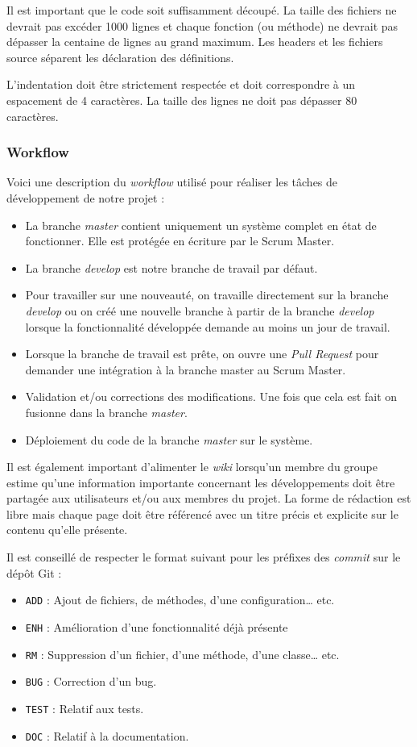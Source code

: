 \documentclass[10pt,a4paper]{article}
\begin{document}
Il est important que le code soit suffisamment découpé. La taille des fichiers ne devrait pas excéder 1000 lignes et chaque fonction (ou méthode) ne devrait pas dépasser la centaine de lignes au grand maximum. Les headers et les fichiers source séparent les déclaration des définitions.

L'indentation doit être strictement respectée et doit correspondre à un espacement de 4 caractères. La taille des lignes ne doit pas dépasser 80 caractères.


\subsubsection{Workflow}

Voici une description du \textit{workflow} utilisé pour réaliser les tâches de développement de notre projet :
\begin{itemize}
\item La branche \textit{master} contient uniquement un système complet en état de fonctionner. Elle est protégée en écriture par le Scrum Master.
\item La branche \textit{develop} est notre branche de travail par défaut.
\item Pour travailler sur une nouveauté, on travaille directement sur la branche \textit{develop} ou on créé une nouvelle branche à partir de la branche \textit{develop} lorsque la fonctionnalité développée demande au moins un jour de travail.
\item Lorsque la branche de travail est prête, on ouvre une \textit{Pull Request} pour demander une intégration à la branche master au Scrum Master.
\item Validation et/ou corrections des modifications. Une fois que cela est fait on fusionne dans la branche \textit{master}.
\item Déploiement du code de la branche \textit{master} sur le système.
\end{itemize}

Il est également important d'alimenter le \textit{wiki} lorsqu'un membre du groupe estime qu'une information importante concernant les développements doit être partagée aux utilisateurs et/ou aux membres du projet. La forme de rédaction est libre mais chaque page doit être référencé avec un titre précis et explicite sur le contenu qu'elle présente.

Il est conseillé de respecter le format suivant pour les préfixes des \textit{commit} sur le dépôt Git :
\begin{itemize}

\item \verb|ADD| : Ajout de fichiers, de méthodes, d'une configuration… etc.
\item \verb|ENH| : Amélioration d'une fonctionnalité déjà présente
\item \verb|RM| : Suppression d'un fichier, d'une méthode, d'une classe… etc.
\item \verb|BUG| : Correction d'un bug.
\item \verb|TEST| : Relatif aux tests.
\item \verb|DOC| : Relatif à la documentation.
\end{itemize}
\end{document}
